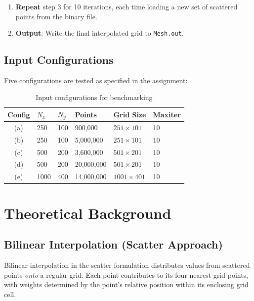 \documentclass[12pt,a4paper]{article}
\begin{document}
\begin{enumerate}
    \item \textbf{Repeat} step 3 for 10 iterations, each time loading a new set of scattered points from the binary file.
    
    \item \textbf{Output}: Write the final interpolated grid to \texttt{Mesh.out}.
\end{enumerate}

\subsection{Input Configurations}

Five configurations are tested as specified in the assignment:

\begin{table}[H]
\centering
\caption{Input configurations for benchmarking}
\begin{tabular}{clllll}
\toprule
\textbf{Config} & $N_x$ & $N_y$ & \textbf{Points} & \textbf{Grid Size} & \textbf{Maxiter} \\
\midrule
(a) & 250 & 100 & 900,000 & $251 \times 101$ & 10 \\
(b) & 250 & 100 & 5,000,000 & $251 \times 101$ & 10 \\
(c) & 500 & 200 & 3,600,000 & $501 \times 201$ & 10 \\
(d) & 500 & 200 & 20,000,000 & $501 \times 201$ & 10 \\
(e) & 1000 & 400 & 14,000,000 & $1001 \times 401$ & 10 \\
\bottomrule
\end{tabular}
\end{table}

\section{Theoretical Background}

\subsection{Bilinear Interpolation (Scatter Approach)}

Bilinear interpolation in the scatter formulation distributes values from scattered points \textit{onto} a regular grid. Each point contributes to its four nearest grid points, with weights determined by the point's relative position within its enclosing grid cell.
\end{document}
